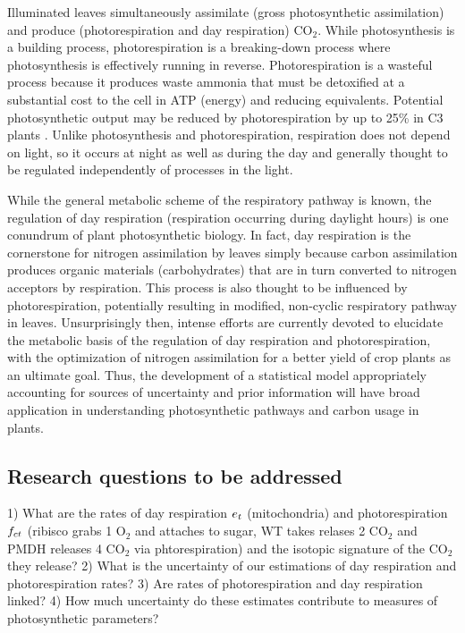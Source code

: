 \documentclass[12pt]{article}
\begin{document}
Illuminated leaves simultaneously assimilate (gross photosynthetic assimilation)
  and produce (photorespiration and day respiration) CO$_2$.
While photosynthesis is a building process,
  photorespiration
  is a breaking-down process where photosynthesis is effectively running in reverse.
Photorespiration is a wasteful process because it
  produces waste ammonia that must be detoxified at a substantial cost
  to the cell in ATP (energy) and reducing equivalents.
Potential photosynthetic output may be reduced by photorespiration by up to 25\%
  in C3 plants \citep{sharkey1988estimating}.
Unlike photosynthesis and photorespiration, respiration does not depend on
  light, so it occurs at night as well as during the day and generally thought to
  be regulated independently of processes in the light.

While the general metabolic scheme of the respiratory pathway is known, the
  regulation of day respiration (respiration occurring during daylight hours) is
  one conundrum of plant photosynthetic biology.
In fact, day respiration is the cornerstone for nitrogen assimilation by leaves simply
  because carbon assimilation produces organic materials (carbohydrates)
  that are in turn converted to nitrogen acceptors by respiration.
This process is also thought to be influenced by photorespiration,
  potentially resulting in modified, non-cyclic respiratory pathway in leaves.
Unsurprisingly then, intense efforts are currently devoted to elucidate the
  metabolic basis of the regulation of day respiration and photorespiration,
  with the optimization of nitrogen assimilation for a better
  yield of crop plants as an ultimate goal.
Thus, the development of a statistical model appropriately accounting for
  sources of uncertainty and prior information
  will have broad application in understanding photosynthetic pathways
  and carbon usage in plants.


\subsection{Research questions to be addressed}

1) What are the rates of day
  respiration $e_{t}$ (mitochondria) and
  photorespiration $f_{ct}$ (ribisco grabs 1 O$_2$ and attaches to sugar,
    WT takes relases 2 CO$_2$ and PMDH releases 4 CO$_2$ via phtorespiration)
    and the isotopic signature of the CO$_2$ they release?
2) What is the uncertainty of our estimations of day respiration and photorespiration rates?
3) Are rates of photorespiration and day respiration linked?
4) How much uncertainty do these estimates contribute to measures of photosynthetic parameters?
\end{document}
